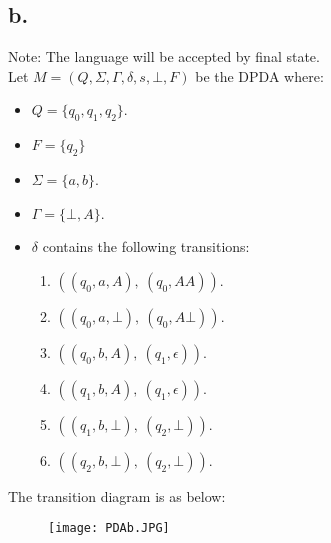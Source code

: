\documentclass[11pt,fleqn]{article}
\newcommand{\be}{\begin{enumerate}}
\newcommand{\ee}{\end{enumerate}}
\newcommand{\bi}{\begin{itemize}}
\newcommand{\ei}{\end{itemize}}
\newcommand{\set}[1]{{\{ #1 \}}}
\begin{document}
	\subsection*{b.}
	Note: The language will be accepted by final state.\\
	Let $M = (Q,\Sigma,\Gamma,\delta,s,\bot,F)$ be the DPDA where:
	\bi
	\item[] $Q = \set{q_0,q_1,q_2}$.
	\item[] $F = \set{q_2}$
	\item[] $\Sigma = \set{a,b}$.
	\item[] $\Gamma = \set{\bot,A}$.
	\item[] $\delta$ contains the following transitions:
	\be
	\item[] $((q_0,a,A),\ (q_0,AA))$.
	\item[] $((q_0,a,\bot),\ (q_0,A\bot))$.
	\item[] $((q_0,b,A),\ (q_1,\epsilon))$.
	\item[] $((q_1,b,A),\ (q_1,\epsilon))$.
	\item[] $((q_1,b,\bot),\ (q_2,\bot))$.
	\item[] $((q_2,b,\bot),\ (q_2,\bot))$.
	
	\ee
	\ei
	The transition diagram is as below:
	\begin{figure}[hbt!]
  	\centering
  	\texttt{[image: PDAb.JPG]}
	\end{figure}
	
\end{document}
